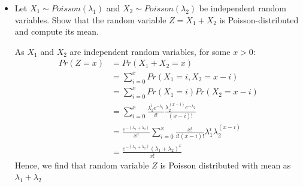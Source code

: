 \documentclass{article}
\begin{document}
\begin{itemize}
\item Let $X_1 \sim Poisson(\lambda_1)$ and $X_2 \sim Poisson(\lambda_2)$ be independent random variables. Show that the random
variable $Z = X_1 + X_2$ is Poisson-distributed and compute its mean.

\begin{mdframed}[backgroundcolor=lightgray]
As ${X_1}$ and ${X_2}$ are independent random variables, for some ${x>0}$:
\begin{align*}
    Pr(Z = x) &= Pr(X_1 + X_2 = x)\\
    &= \sum_{i=0}^x Pr(X_1 = i, X_2 = x-i)\\
    &= \sum_{i=0}^x Pr(X_1 = i) Pr(X_2 = x-i)\\
    &= \sum_{i=0}^x \frac{\lambda_1^i e^{-\lambda_1} }{i!} \frac{\lambda_2^{(x-i)} e^{-\lambda_2}}{(x-i)!}\\
    &= \frac{e^{-(\lambda_1 + \lambda_2)}}{x!} \sum_{i=0}^x \frac{x!}{i! (x-i)!} \lambda_1^i \lambda_2^{(x-i)}\\
    &=  \frac{e^{-(\lambda_1 + \lambda_2)} (\lambda_1 + \lambda_2)^x}{x!}
\end{align*}
Hence,  we find that random variable $Z$ is Poisson distributed with mean as ${\lambda_1 + \lambda_2}$ 
\end{mdframed}

\end{itemize}
\end{document}
